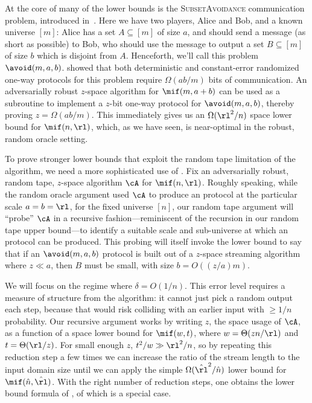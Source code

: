 \begin{itemize}
\begin{itemize}
 At the core of many of the \mif lower bounds is
the \textsc{SubsetAvoidance} communication problem, introduced
in~\cite{ChakrabartiGS22}. Here we have two players, Alice and Bob, and a
known universe $[m]$: Alice has a set $A \subseteq [m]$ of size $a$, and
should send a message (as short as possible) to Bob, who should use the
message to output a set $B \subseteq [m]$ of size $b$ which is disjoint from
$A$. Henceforth, we'll call this problem $\avoid(m,a,b)$.
\cite{ChakrabartiGS22} showed that both deterministic and constant-error
randomized one-way protocols for this problem require $\Omega(a b /m)$ bits of
communication. An adversarially robust $z$-space algorithm for $\mif(m, a +
b)$ can be used as a subroutine to implement a $z$-bit one-way protocol for
$\avoid(m,a,b)$, thereby proving $z = \Omega(a b /m)$. This immediately gives
us an $\Omega(\rl^2/n)$ space lower bound for $\mif(n,\rl)$, which, as we have
seen, is near-optimal in the robust, random oracle setting.

%
To prove stronger lower bounds that exploit the random tape limitation of the
algorithm, we need a more sophisticated use of \avoid. Fix an adversarially
robust, random tape, $z$-space algorithm $\cA$ for $\mif(n,\rl)$.  Roughly speaking,
while the random oracle argument used $\cA$ to produce an \avoid protocol at
the particular scale $a = b = \rl$, for the fixed universe $[n]$, our random
tape argument will ``probe'' $\cA$ in a recursive fashion---reminiscent of the
recursion in our random tape upper bound---to identify a suitable scale and
sub-universe at which an \avoid protocol can be produced. This probing will
itself invoke the \avoid lower bound to say that if an $\avoid(m,a,b)$
protocol is built out of a $z$-space streaming algorithm where $z \ll a$, then
$B$ must be small, with size $b = O((z/a) m)$.

We will focus on the regime where $\delta = O(1/n)$. This error level requires
a measure of structure from the algorithm: it cannot just pick a random output
each step, because that would risk colliding with an earlier input with $\ge
1/n$ probability. Our recursive argument works by writing $z$, the space usage
of $\cA$, as a function of a space lower bound for $\mif(w,t)$, where $w =
\Theta(z n / \rl)$ and $t = \Theta(\rl/z)$. For small enough $z$, $t^2/w \gg
\rl^2/n$, so by repeating this reduction step a few times we can increase the
ratio of the stream length to the input domain size until we can apply the
simple $\Omega(\hat{\rl}^2/\hat{n})$ lower bound for
$\mif(\hat{n},\hat{\rl})$.  With the right number of reduction steps, one
obtains the lower bound formula of , of which
 is a special case.


\end{itemize}
\end{itemize}
